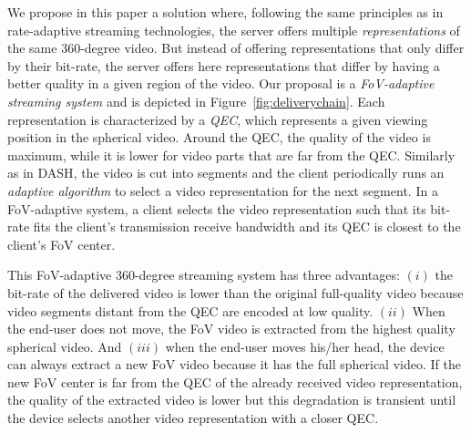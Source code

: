 We propose in this paper a solution where, following the same principles as in
rate-adaptive streaming technologies, the server offers multiple \emph{representations}
of the same 360-degree video. But instead of offering representations that only differ by
their bit-rate, the server offers here representations that differ by
having a better quality in a given region of the video.
Our proposal is a \emph{FoV-adaptive streaming system} and is depicted in Figure~\ref{fig:deliverychain}.
Each representation is characterized by a \emph{\ac{QEC}}, which represents a given viewing
position in the spherical video. Around the \ac{QEC}, the quality of the video is maximum,
while it is lower for video parts that are far from the \ac{QEC}. Similarly as
in \ac{DASH}, the video is cut into segments and the client periodically runs
an \emph{adaptive algorithm} to select
a video representation for the next segment. In a \ac{FoV}-adaptive system, a client selects
the video representation such that its bit-rate fits the client's transmission receive bandwidth and its
\ac{QEC} is closest to the client's \ac{FoV} center.



This \ac{FoV}-adaptive 360-degree streaming system has three advantages:
$(i)$ the bit-rate of the delivered video is lower than the original full-quality video because video segments distant from the \ac{QEC} are encoded at low quality.
$(ii)$ When the end-user does not move, the \ac{FoV} video is extracted from the highest
quality spherical video.
And $(iii)$ when the end-user moves his/her head, the device can
always extract
a new \ac{FoV} video because it has the full spherical video. If the
new \ac{FoV} center is far from the
\ac{QEC} of the already received video representation, the quality of the extracted video is lower but this
degradation is transient until the
device selects another video representation with a closer \ac{QEC}.

